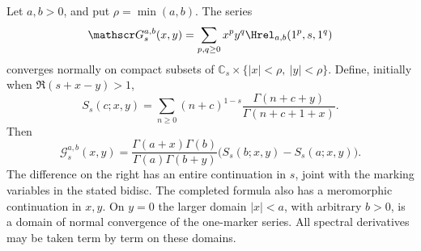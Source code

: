 \begin{theorem}\label{ord:two}
Let $a,b>0$, and put $\rho=\min(a,b)$.  The series
\begin{equation}\label{ord:Gdef}
 \mathscr G_s^{a,b}(x,y)
   =\sum_{p,q\ge0}x^py^q\Hrel_{a,b}(1^p,s,1^q)
\end{equation}
converges normally on compact subsets of
$\mathbb C_s\times\{|x|<\rho,\ |y|<\rho\}$.  Define, initially when
$\Re(s+x-y)>1$,
\begin{equation}\label{ord:kernel}
 S_s(c;x,y)=
   \sum_{n\ge0}(n+c)^{1-s}
       \frac{\Gamma(n+c+y)}{\Gamma(n+c+1+x)}.
\end{equation}
Then
\begin{equation}\label{ord:twoformula}
 \boxed{\;
 \mathscr G_s^{a,b}(x,y)
 =\frac{\Gamma(a+x)\Gamma(b)}
        {\Gamma(a)\Gamma(b+y)}
       \bigl(S_s(b;x,y)-S_s(a;x,y)\bigr).
 \;}
\end{equation}
The difference on the right has an entire continuation in $s$, joint
with the marking variables in the stated bidisc.  The completed formula
also has a meromorphic continuation in $x,y$.  On $y=0$ the larger domain
$|x|<a$, with arbitrary $b>0$, is a domain of normal convergence of the
one-marker series.  All spectral derivatives may be taken term by term
on these domains.
\end{theorem}

